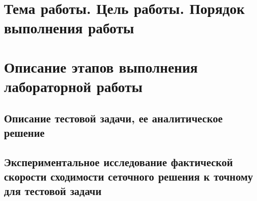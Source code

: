 \documentclass[a4paper,12pt,russian, fleqn]{extreport}
\begin{document}
	\section{Тема работы. Цель работы. Порядок выполнения работы}
	\section{Описание этапов выполнения лабораторной работы}
	\subsection{Описание тестовой задачи, ее аналитическое решение}
	\subsection{Экспериментальное исследование фактической скорости сходимости сеточного решения к точному для тестовой задачи}
\end{document}
